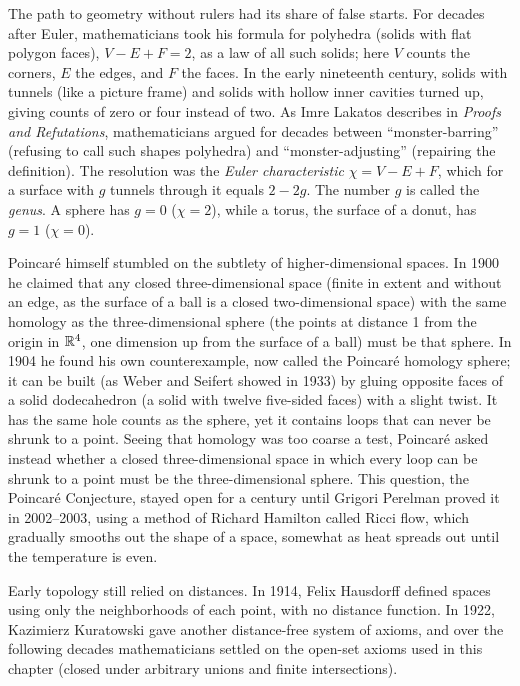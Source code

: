 \begin{historybox}
The path to geometry without rulers had its share of false starts. For decades after Euler, mathematicians took his formula for polyhedra (solids with flat polygon faces), $V - E + F = 2$, as a law of all such solids; here $V$ counts the corners, $E$ the edges, and $F$ the faces. In the early nineteenth century, solids with tunnels (like a picture frame) and solids with hollow inner cavities turned up, giving counts of zero or four instead of two. As Imre Lakatos describes in \emph{Proofs and Refutations}, mathematicians argued for decades between ``monster-barring'' (refusing to call such shapes polyhedra) and ``monster-adjusting'' (repairing the definition). The resolution was the \emph{Euler characteristic} $\chi = V - E + F$, which for a surface with $g$ tunnels through it equals $2 - 2g$. The number $g$ is called the \emph{genus}. A sphere has $g=0$ ($\chi = 2$), while a torus, the surface of a donut, has $g=1$ ($\chi = 0$).

Poincar\'e himself stumbled on the subtlety of higher-dimensional spaces. In 1900 he claimed that any closed three-dimensional space (finite in extent and without an edge, as the surface of a ball is a closed two-dimensional space) with the same homology as the three-dimensional sphere (the points at distance 1 from the origin in $\mathbb{R}^4$, one dimension up from the surface of a ball) must be that sphere. In 1904 he found his own counterexample, now called the Poincar\'e homology sphere; it can be built (as Weber and Seifert showed in 1933) by gluing opposite faces of a solid dodecahedron (a solid with twelve five-sided faces) with a slight twist. It has the same hole counts as the sphere, yet it contains loops that can never be shrunk to a point. Seeing that homology was too coarse a test, Poincar\'e asked instead whether a closed three-dimensional space in which every loop can be shrunk to a point must be the three-dimensional sphere. This question, the Poincar\'e Conjecture, stayed open for a century until Grigori Perelman proved it in 2002--2003, using a method of Richard Hamilton called Ricci flow, which gradually smooths out the shape of a space, somewhat as heat spreads out until the temperature is even.

Early topology still relied on distances. In 1914, Felix Hausdorff defined spaces using only the neighborhoods of each point, with no distance function. In 1922, Kazimierz Kuratowski gave another distance-free system of axioms, and over the following decades mathematicians settled on the open-set axioms used in this chapter (closed under arbitrary unions and finite intersections).


\end{historybox}
